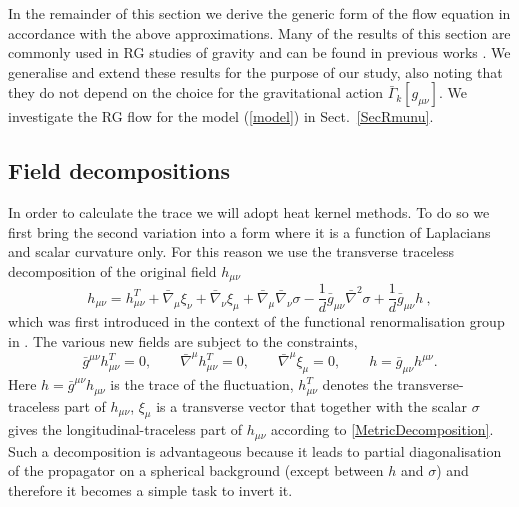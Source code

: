 \documentclass[notitlepage,eqsecnum,bm,amsmath,preprintnumbers,superscriptaddress,nofootinbib,aps,11pt]{revtex4-1}
\def\eq#1{(\ref{#1})}
\begin{document}
In the remainder of this section we derive the generic form of the flow equation in accordance with the above approximations. 
Many of the results of this section 
are commonly used in RG studies of gravity and can be found in  previous works 
\cite{Reuter:1996cp,Lauscher:2002sq,Dou:1997fg,Codello:2007bd,Machado:2007ea}. We generalise and extend these results for the purpose of our study, also noting that they do not depend 
on the choice for the  gravitational action $\bar{\Gamma}_k[g_{\mu\nu}]$. We investigate the RG flow for the model \eq{model} in Sect.~\ref{SecRmunu}.




\subsection{Field decompositions}
\label{subsec:Decompositions}

In order to calculate the trace we will adopt heat kernel methods. To do so we first bring the second variation into a form where 
it is a function of Laplacians and scalar curvature only. 
For this reason we use the transverse traceless decomposition of the original field $h_{\mu\nu}$ 
\cite{York:1973ia} 
\begin{equation}
h_{\mu\nu}=h^T_{\mu\nu}+\bar \nabla_{\mu}\xi_{\nu}+\bar \nabla_{\nu}\xi_{\mu}+\bar \nabla_{\mu}\bar \nabla_{\nu}\sigma-\frac{1}{d}\bar g_{\mu\nu}\bar \nabla^2\sigma+\frac{1}{d}\bar g_{\mu\nu}h\ ,\label{MetricDecomposition}
\end{equation}
which was first introduced in the context of the functional renormalisation group in \cite{Dou:1997fg}.
The various new fields are subject to the constraints, 
\begin{equation}
\bar g^{\mu\nu}h^T_{\mu\nu}=0, \qquad \bar \nabla^{\mu}h^T_{\mu\nu}=0, \qquad \bar \nabla^{\mu}\xi_{\mu}=0, 
\qquad h=\bar g_{\mu\nu}h^{\mu\nu}.
\end{equation}
Here $h=\bar g^{\mu\nu}h_{\mu\nu}$ is the trace of the fluctuation, $h_{\mu\nu}^T$ denotes the transverse-traceless part of 
$h_{\mu\nu}$, $\xi_{\mu}$ is a transverse vector that together with the scalar $\sigma$ gives the longitudinal-traceless part 
of $h_{\mu\nu}$ according to \eqref{MetricDecomposition}. Such a decomposition is advantageous because it leads to partial 
diagonalisation  of the propagator on a spherical background (except between $h$ and $\sigma$) and therefore it becomes a simple task 
to invert it.
\end{document}

